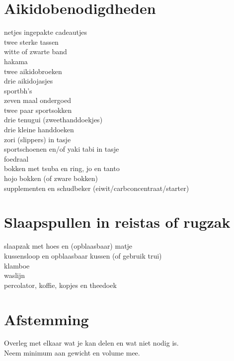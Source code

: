 \documentclass[9pt,twocolumn]{memoir}
\begin{document}
\section*{Aikidobenodigdheden}%
netjes ingepakte cadeautjes\\%
twee sterke tassen\\%
witte of zwarte band\\%
hakama\\%
twee aikidobroeken\\%
drie aikidojasjes\\%
sportbh's\\%
zeven maal ondergoed\\%
twee paar sportsokken\\%
drie tenugui (zweethanddoekjes)\\%
drie kleine handdoeken\\%
zori (slippers) in tasje\\%
sportschoenen en/of yaki tabi in tasje\\%
foedraal\\%
bokken met tsuba en ring, jo en tanto\\%
hojo bokken (of zware bokken)\\%
supplementen en schudbeker (eiwit/carbconcentraat/starter)%

\section*{Slaapspullen in reistas of rugzak}%
slaapzak met hoes en (opblaasbaar) matje\\%
kussensloop en opblaasbaar kussen (of gebruik trui)\\%
klamboe\\%
waslijn\\%
percolator, koffie, kopjes en theedoek%

\section*{Afstemming}%
Overleg met elkaar wat je kan delen en wat niet nodig is.\\%
Neem minimum aan gewicht en volume mee.%
\end{document}
